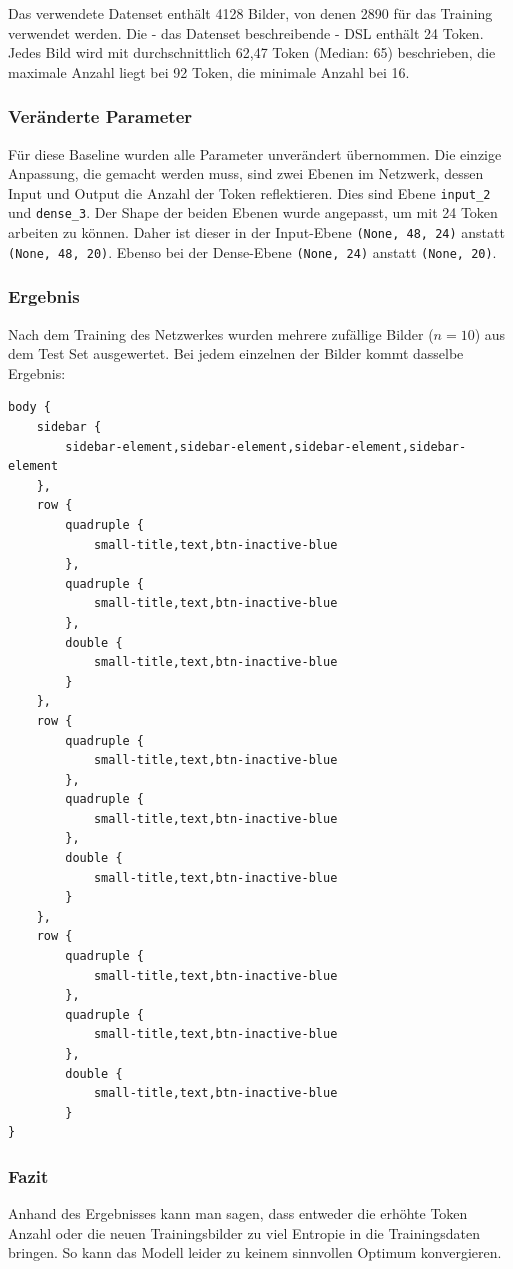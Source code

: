 \documentclass[pdftex,a4paper,halfparskip, article]{scrartcl}
\begin{document}
Das verwendete Datenset enthält 4128 Bilder, von denen 2890 für das Training verwendet werden. Die - das Datenset beschreibende - DSL enthält 24 Token. Jedes Bild wird mit durchschnittlich 62,47 Token (Median: 65) beschrieben, die maximale Anzahl liegt bei 92 Token, die minimale Anzahl bei 16. 

\subsubsection*{Veränderte Parameter}

Für diese Baseline wurden alle Parameter unverändert übernommen. Die einzige Anpassung, die gemacht werden muss, sind zwei Ebenen im Netzwerk, dessen Input und Output die Anzahl der Token reflektieren. Dies sind Ebene \texttt{input\_2} und \texttt{dense\_3}. Der Shape der beiden Ebenen wurde angepasst, um mit 24 Token arbeiten zu können. Daher ist dieser in der Input-Ebene \texttt{(None, 48, 24)} anstatt \texttt{(None, 48, 20)}. Ebenso bei der Dense-Ebene \texttt{(None, 24)} anstatt \texttt{(None, 20)}.

\subsubsection*{Ergebnis}

Nach dem Training des Netzwerkes wurden mehrere zufällige Bilder ($n=10$) aus dem Test Set ausgewertet. Bei jedem einzelnen der Bilder kommt dasselbe Ergebnis:

\begin{verbatim}
body {
	sidebar {
		sidebar-element,sidebar-element,sidebar-element,sidebar-element
	},
	row {
		quadruple {
			small-title,text,btn-inactive-blue
		},
		quadruple {
			small-title,text,btn-inactive-blue
		},
		double {
			small-title,text,btn-inactive-blue
		}
	},
	row {
		quadruple {
			small-title,text,btn-inactive-blue
		},
		quadruple {
			small-title,text,btn-inactive-blue
		},
		double {
			small-title,text,btn-inactive-blue
		}
	},
	row {
		quadruple {
			small-title,text,btn-inactive-blue
		},
		quadruple {
			small-title,text,btn-inactive-blue
		},
		double {
			small-title,text,btn-inactive-blue
		}
}
\end{verbatim}

\subsubsection*{Fazit}

Anhand des Ergebnisses kann man sagen, dass entweder die erhöhte Token Anzahl oder die neuen Trainingsbilder zu viel Entropie in die Trainingsdaten bringen. So kann das Modell leider zu keinem sinnvollen Optimum konvergieren. 
\end{document}
